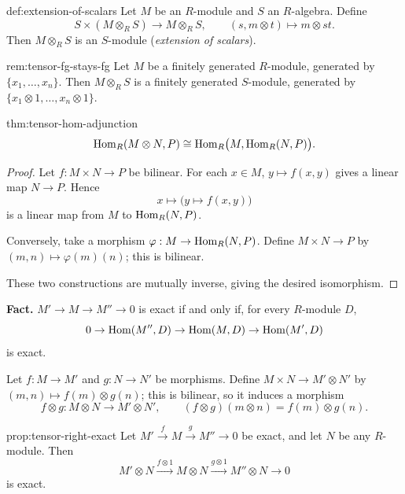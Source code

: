 \begin{definition}{}{def:extension-of-scalars}
Let $M$ be an $R$-module and $S$ an $R$-algebra. Define
\[
S \times (M\otimes_R S) \to M\otimes_R S, \qquad (s, m\otimes t) \mapsto m\otimes st.
\]
Then $M\otimes_R S$ is an $S$-module (\emph{extension of scalars}).
\end{definition}

\begin{remark}{}{rem:tensor-fg-stays-fg}
Let $M$ be a finitely generated $R$-module, generated by $\{x_1,\ldots,x_n\}$. Then $M\otimes_R S$ is a finitely generated $S$-module, generated by $\{x_1\otimes1,\ldots,x_n\otimes1\}$.
\end{remark}

\begin{theorem}{}{thm:tensor-hom-adjunction}
\[
\operatorname{Hom}_R(M\otimes N, P) \cong \operatorname{Hom}_R\bigl(M, \operatorname{Hom}_R(N,P)\bigr).
\]
\end{theorem}

\begin{proof}
Let $f: M\times N \to P$ be bilinear. For each $x\in M$, $y \mapsto f(x,y)$ gives a linear map $N \to P$. Hence
\[
x \longmapsto \bigl(y \mapsto f(x,y)\bigr)
\]
is a linear map from $M$ to $\operatorname{Hom}_R(N,P)$.

Conversely, take a morphism $\varphi: M \to \operatorname{Hom}_R(N,P)$. Define $M\times N \to P$ by $(m,n)\mapsto \varphi(m)(n)$; this is bilinear.

These two constructions are mutually inverse, giving the desired isomorphism.
\end{proof}

\begin{notation}
\textbf{Fact.} $M' \to M \to M'' \to 0$ is exact if and only if, for every $R$-module $D$,
\[
0 \to \operatorname{Hom}(M'',D) \to \operatorname{Hom}(M,D) \to \operatorname{Hom}(M',D)
\]
is exact.
\end{notation}

Let $f: M\to M'$ and $g: N\to N'$ be morphisms. Define $M\times N \to M'\otimes N'$ by $(m,n)\mapsto f(m)\otimes g(n)$; this is bilinear, so it induces a morphism
\[
f\otimes g: M\otimes N \to M'\otimes N', \qquad (f\otimes g)(m\otimes n) = f(m)\otimes g(n).
\]

\begin{proposition}{}{prop:tensor-right-exact}
Let $M' \xrightarrow{f} M \xrightarrow{g} M'' \to 0$ be exact, and let $N$ be any $R$-module. Then
\[
M'\otimes N \xrightarrow{f\otimes 1} M\otimes N \xrightarrow{g\otimes 1} M''\otimes N \to 0
\]
is exact.
\end{proposition}


